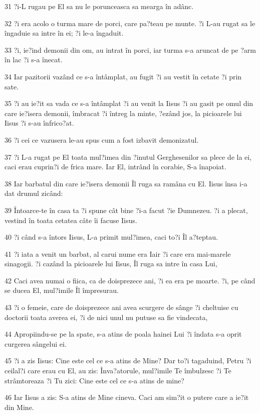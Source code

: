 \par 31 ?i-L rugau pe El sa nu le porunceasca sa mearga în adânc.
\par 32 ?i era acolo o turma mare de porci, care pa?teau pe munte. ?i L-au rugat sa le îngaduie sa intre în ei; ?i le-a îngaduit.
\par 33 ?i, ie?ind demonii din om, au intrat în porci, iar turma s-a aruncat de pe ?arm în lac ?i s-a înecat.
\par 34 Iar pazitorii vazând ce s-a întâmplat, au fugit ?i au vestit în cetate ?i prin sate.
\par 35 ?i au ie?it sa vada ce s-a întâmplat ?i au venit la Iisus ?i au gasit pe omul din care ie?isera demonii, îmbracat ?i întreg la minte, ?ezând jos, la picioarele lui Iisus ?i s-au înfrico?at.
\par 36 ?i cei ce vazusera le-au spus cum a fost izbavit demonizatul.
\par 37 ?i L-a rugat pe El toata mul?imea din ?inutul Gerghesenilor sa plece de la ei, caci erau cuprin?i de frica mare. Iar El, intrând în corabie, S-a înapoiat.
\par 38 Iar barbatul din care ie?isera demonii Îl ruga sa ramâna cu El. Iisus însa i-a dat drumul zicând:
\par 39 Întoarce-te în casa ta ?i spune cât bine ?i-a facut ?ie Dumnezeu. ?i a plecat, vestind în toata cetatea câte îi facuse Iisus.
\par 40 ?i când s-a întors Iisus, L-a primit mul?imea, caci to?i Îl a?teptau.
\par 41 ?i iata a venit un barbat, al carui nume era Iair ?i care era mai-marele sinagogii. ?i cazând la picioarele lui Iisus, Îl ruga sa intre în casa Lui,
\par 42 Caci avea numai o fiica, ca de doisprezece ani, ?i ea era pe moarte. ?i, pe când se ducea El, mul?imile Îl împresurau.
\par 43 ?i o femeie, care de doisprezece ani avea scurgere de sânge ?i cheltuise cu doctorii toata averea ei, ?i de nici unul nu putuse sa fie vindecata,
\par 44 Apropiindu-se pe la spate, s-a atins de poala hainei Lui ?i îndata s-a oprit curgerea sângelui ei.
\par 45 ?i a zis Iisus: Cine este cel ce s-a atins de Mine? Dar to?i tagaduind, Petru ?i ceilal?i care erau cu El, au zis: Înva?atorule, mul?imile Te îmbulzesc ?i Te strâmtoreaza ?i Tu zici: Cine este cel ce s-a atins de mine?
\par 46 Iar Iisus a zis: S-a atins de Mine cineva. Caci am sim?it o putere care a ie?it din Mine.
